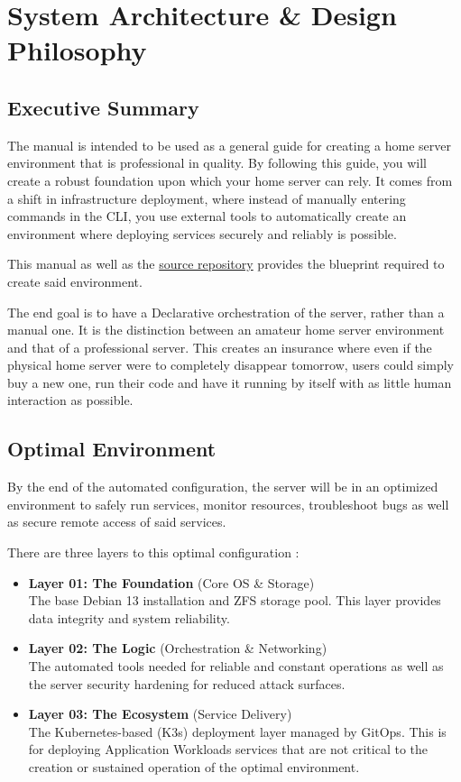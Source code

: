 \chapter{System Architecture \& Design Philosophy} \label{chap:architecture}
\section{Executive Summary}
The manual is intended to be used as a general guide for creating a home server environment that is professional in quality.
By following this guide, you will create a robust foundation upon which your home server can rely.
It comes from a shift in infrastructure deployment, where instead of manually entering commands in the CLI, you use external tools to automatically create an environment where deploying services securely and reliably is possible. 

This manual as well as the \href{\githubrepo}{source repository} provides the blueprint required to create said environment.

The end goal is to have a Declarative orchestration of the server, rather than a manual one. It is the distinction between an amateur home server environment and that of a professional server. 
This creates an insurance where even if the physical home server were to completely disappear tomorrow, users could simply buy a new one, run their code and have it running by itself with as little human interaction as possible. 

\section{Optimal Environment}
By the end of the automated configuration, the server will be in an optimized environment to safely run services, monitor resources, troubleshoot bugs as well as secure remote access of said services.

There are three layers to this optimal configuration :

\begin{itemize}
	\item \textbf{Layer 01: The Foundation} (Core OS \& Storage) \\
	The base Debian 13 installation and ZFS storage pool. This layer provides data integrity and system reliability.
	\item \textbf{Layer 02: The Logic} (Orchestration \& Networking) \\
	The automated tools needed for reliable and constant operations as well as the server security hardening for reduced attack surfaces.
	\item \textbf{Layer 03: The Ecosystem} (Service Delivery) \\
	The Kubernetes-based (K3s) deployment layer managed by GitOps. This is for deploying Application Workloads services that are not critical to the creation or sustained operation of the optimal environment.
\end{itemize}